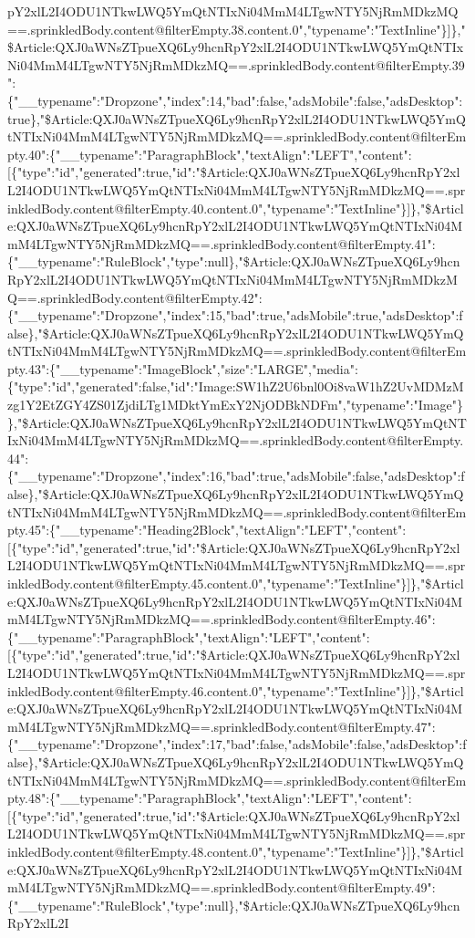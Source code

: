 pY2xlL2I4ODU1NTkwLWQ5YmQtNTIxNi04MmM4LTgwNTY5NjRmMDkzMQ==.sprinkledBody.content@filterEmpty.38.content.0","typename":"TextInline"\}{]}\},"\$Article:QXJ0aWNsZTpueXQ6Ly9hcnRpY2xlL2I4ODU1NTkwLWQ5YmQtNTIxNi04MmM4LTgwNTY5NjRmMDkzMQ==.sprinkledBody.content@filterEmpty.39":\{"\_\_typename":"Dropzone","index":14,"bad":false,"adsMobile":false,"adsDesktop":true\},"\$Article:QXJ0aWNsZTpueXQ6Ly9hcnRpY2xlL2I4ODU1NTkwLWQ5YmQtNTIxNi04MmM4LTgwNTY5NjRmMDkzMQ==.sprinkledBody.content@filterEmpty.40":\{"\_\_typename":"ParagraphBlock","textAlign":"LEFT","content":{[}\{"type":"id","generated":true,"id":"\$Article:QXJ0aWNsZTpueXQ6Ly9hcnRpY2xlL2I4ODU1NTkwLWQ5YmQtNTIxNi04MmM4LTgwNTY5NjRmMDkzMQ==.sprinkledBody.content@filterEmpty.40.content.0","typename":"TextInline"\}{]}\},"\$Article:QXJ0aWNsZTpueXQ6Ly9hcnRpY2xlL2I4ODU1NTkwLWQ5YmQtNTIxNi04MmM4LTgwNTY5NjRmMDkzMQ==.sprinkledBody.content@filterEmpty.41":\{"\_\_typename":"RuleBlock","type":null\},"\$Article:QXJ0aWNsZTpueXQ6Ly9hcnRpY2xlL2I4ODU1NTkwLWQ5YmQtNTIxNi04MmM4LTgwNTY5NjRmMDkzMQ==.sprinkledBody.content@filterEmpty.42":\{"\_\_typename":"Dropzone","index":15,"bad":true,"adsMobile":true,"adsDesktop":false\},"\$Article:QXJ0aWNsZTpueXQ6Ly9hcnRpY2xlL2I4ODU1NTkwLWQ5YmQtNTIxNi04MmM4LTgwNTY5NjRmMDkzMQ==.sprinkledBody.content@filterEmpty.43":\{"\_\_typename":"ImageBlock","size":"LARGE","media":\{"type":"id","generated":false,"id":"Image:SW1hZ2U6bnl0Oi8vaW1hZ2UvMDMzMzg1Y2EtZGY4ZS01ZjdiLTg1MDktYmExY2NjODBkNDFm","typename":"Image"\}\},"\$Article:QXJ0aWNsZTpueXQ6Ly9hcnRpY2xlL2I4ODU1NTkwLWQ5YmQtNTIxNi04MmM4LTgwNTY5NjRmMDkzMQ==.sprinkledBody.content@filterEmpty.44":\{"\_\_typename":"Dropzone","index":16,"bad":true,"adsMobile":false,"adsDesktop":false\},"\$Article:QXJ0aWNsZTpueXQ6Ly9hcnRpY2xlL2I4ODU1NTkwLWQ5YmQtNTIxNi04MmM4LTgwNTY5NjRmMDkzMQ==.sprinkledBody.content@filterEmpty.45":\{"\_\_typename":"Heading2Block","textAlign":"LEFT","content":{[}\{"type":"id","generated":true,"id":"\$Article:QXJ0aWNsZTpueXQ6Ly9hcnRpY2xlL2I4ODU1NTkwLWQ5YmQtNTIxNi04MmM4LTgwNTY5NjRmMDkzMQ==.sprinkledBody.content@filterEmpty.45.content.0","typename":"TextInline"\}{]}\},"\$Article:QXJ0aWNsZTpueXQ6Ly9hcnRpY2xlL2I4ODU1NTkwLWQ5YmQtNTIxNi04MmM4LTgwNTY5NjRmMDkzMQ==.sprinkledBody.content@filterEmpty.46":\{"\_\_typename":"ParagraphBlock","textAlign":"LEFT","content":{[}\{"type":"id","generated":true,"id":"\$Article:QXJ0aWNsZTpueXQ6Ly9hcnRpY2xlL2I4ODU1NTkwLWQ5YmQtNTIxNi04MmM4LTgwNTY5NjRmMDkzMQ==.sprinkledBody.content@filterEmpty.46.content.0","typename":"TextInline"\}{]}\},"\$Article:QXJ0aWNsZTpueXQ6Ly9hcnRpY2xlL2I4ODU1NTkwLWQ5YmQtNTIxNi04MmM4LTgwNTY5NjRmMDkzMQ==.sprinkledBody.content@filterEmpty.47":\{"\_\_typename":"Dropzone","index":17,"bad":false,"adsMobile":false,"adsDesktop":false\},"\$Article:QXJ0aWNsZTpueXQ6Ly9hcnRpY2xlL2I4ODU1NTkwLWQ5YmQtNTIxNi04MmM4LTgwNTY5NjRmMDkzMQ==.sprinkledBody.content@filterEmpty.48":\{"\_\_typename":"ParagraphBlock","textAlign":"LEFT","content":{[}\{"type":"id","generated":true,"id":"\$Article:QXJ0aWNsZTpueXQ6Ly9hcnRpY2xlL2I4ODU1NTkwLWQ5YmQtNTIxNi04MmM4LTgwNTY5NjRmMDkzMQ==.sprinkledBody.content@filterEmpty.48.content.0","typename":"TextInline"\}{]}\},"\$Article:QXJ0aWNsZTpueXQ6Ly9hcnRpY2xlL2I4ODU1NTkwLWQ5YmQtNTIxNi04MmM4LTgwNTY5NjRmMDkzMQ==.sprinkledBody.content@filterEmpty.49":\{"\_\_typename":"RuleBlock","type":null\},"\$Article:QXJ0aWNsZTpueXQ6Ly9hcnRpY2xlL2I